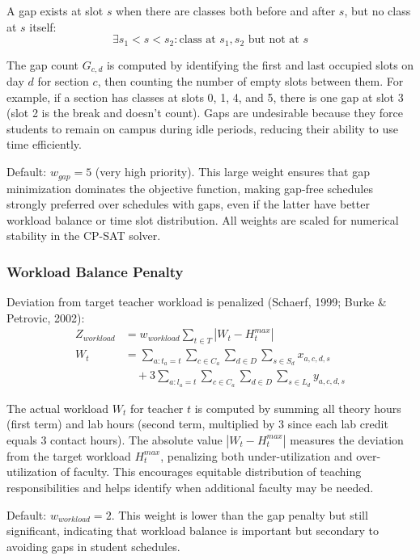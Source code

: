 \documentclass[12pt,a4paper]{article}
\begin{document}
A gap exists at slot $s$ when there are classes both before and after $s$, but no class at $s$ itself:
\begin{equation}
\exists s_1 < s < s_2 : \text{class at } s_1, s_2 \text{ but not at } s
\end{equation}

The gap count $G_{c,d}$ is computed by identifying the first and last occupied slots on day $d$ for section $c$, then counting the number of empty slots between them. For example, if a section has classes at slots 0, 1, 4, and 5, there is one gap at slot 3 (slot 2 is the break and doesn't count). Gaps are undesirable because they force students to remain on campus during idle periods, reducing their ability to use time efficiently.

Default: $w_{gap} = 5$ (very high priority). This large weight ensures that gap minimization dominates the objective function, making gap-free schedules strongly preferred over schedules with gaps, even if the latter have better workload balance or time slot distribution. All weights are scaled for numerical stability in the CP-SAT solver.

\subsubsection{Workload Balance Penalty}

Deviation from target teacher workload is penalized (Schaerf, 1999; Burke \& Petrovic, 2002):
\begin{align}
Z_{workload} &= w_{workload} \sum_{t \in T} |W_t - H_t^{max}| \\
W_t &= \sum_{a: t_a = t} \sum_{c \in C_a} \sum_{d \in D} \sum_{s \in S_d} x_{a,c,d,s} \\
&\quad + 3 \sum_{a: l_a = t} \sum_{c \in C_a} \sum_{d \in D} \sum_{s \in L_d} y_{a,c,d,s}
\end{align}

The actual workload $W_t$ for teacher $t$ is computed by summing all theory hours (first term) and lab hours (second term, multiplied by 3 since each lab credit equals 3 contact hours). The absolute value $|W_t - H_t^{max}|$ measures the deviation from the target workload $H_t^{max}$, penalizing both under-utilization and over-utilization of faculty. This encourages equitable distribution of teaching responsibilities and helps identify when additional faculty may be needed.

Default: $w_{workload} = 2$. This weight is lower than the gap penalty but still significant, indicating that workload balance is important but secondary to avoiding gaps in student schedules.
\end{document}
